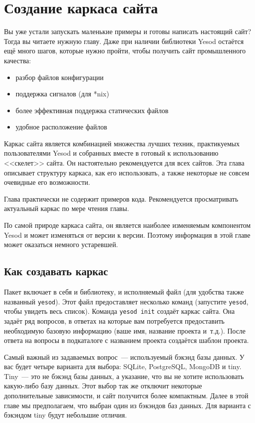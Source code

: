 \chapter{Создание каркаса сайта}\label{chap:scaffolding}
Вы уже устали запускать маленькие примеры и готовы написать настоящий сайт?
Тогда вы читаете нужную главу. Даже при наличии библиотеки Yesod
остаётся ещё много шагов, которые нужно пройти, чтобы получить сайт
промышленного качества:
\begin{itemize}
  \item разбор файлов конфигурации
  \item поддержка сигналов (для *nix)
  \item более эффективная поддержка статических файлов
  \item удобное расположение файлов
\end{itemize}

Каркас сайта является комбинацией множества лучших техник, практикуемых пользователями Yesod и собранных вместе в готовый к
использованию <<скелет>> сайта. Он настоятельно рекомендуется для всех сайтов.
Эта глава описывает структуру каркаса, как его использовать, а также некоторые
не совсем очевидные его возможности.

Глава практически не содержит примеров кода. Рекомендуется
просматривать актуальный каркас по мере чтения главы.

\begin{remark}
  По самой природе каркаса сайта, он является наиболее изменяемым компонентом Yesod и
  может изменяться от версии к версии. Поэтому информация в этой главе может оказаться немного устаревшей.
\end{remark}

\section{Как создавать каркас}
Пакет 
включает в себя и библиотеку, и исполняемый файл (для удобства
также названный \texttt{yesod}). Этот файл предоставляет несколько
команд (запустите \texttt{yesod}, чтобы увидеть весь список). Команда
\texttt{yesod init} создаёт каркас сайта. Она задаёт ряд вопросов, в ответах на которые
вам потребуется предоставить необходимую базовую информацию
(ваше имя, название проекта и~т.д.). После ответа на вопросы в подкаталоге с
названием проекта создаётся шаблон проекта.

Самый важный из задаваемых вопрос~--- используемый бэкэнд базы данных. У вас будет четыре варианта
для выбора: SQLite, PostgreSQL, MongoDB и tiny.
Tiny~--- это не бэкэнд базы данных, а указание, что вы не хотите использовать
какую-либо базу данных. Этот выбор так же отключит некоторые дополнительные
зависимости, и сайт получится более компактным. Далее в этой главе мы предполагаем,
что выбран один из бэкэндов баз данных. Для варианта с бэкэндом tiny
будут небольшие отличия.

